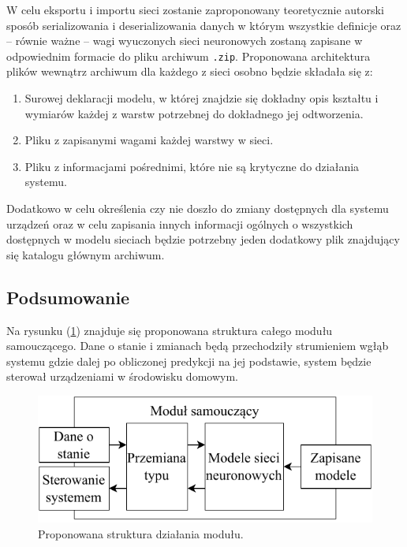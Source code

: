 W celu eksportu i importu sieci zostanie zaproponowany teoretycznie autorski sposób serializowania i deserializowania danych w którym wszystkie definicje oraz -- równie ważne -- wagi wyuczonych sieci neuronowych zostaną zapisane w odpowiednim formacie do pliku archiwum \verb+.zip+. Proponowana architektura plików wewnątrz archiwum dla każdego z sieci osobno będzie składała się z:
\begin{enumerate}
    \item Surowej deklaracji modelu, w której znajdzie się dokładny opis kształtu i wymiarów każdej z warstw potrzebnej do dokładnego jej odtworzenia.
    \item Pliku z zapisanymi wagami każdej warstwy w sieci.
    \item Pliku z informacjami pośrednimi, które nie są krytyczne do działania systemu.
\end{enumerate}

Dodatkowo w celu określenia czy nie doszło do zmiany dostępnych dla systemu urządzeń oraz w celu zapisania innych informacji ogólnych o wszystkich dostępnych w modelu sieciach będzie potrzebny jeden dodatkowy plik znajdujący się katalogu głównym archiwum.

\subsection{Podsumowanie}
Na rysunku (\ref{fig:architektura_modułu}) znajduje się proponowana struktura całego modułu samouczącego. Dane o stanie i zmianach będą przechodziły strumieniem wgłąb systemu gdzie dalej po obliczonej predykcji na jej podstawie, system będzie sterował urządzeniami w środowisku domowym.

\begin{figure}
    \centering\includegraphics[width=.55\textwidth]{img/architecture_module.pdf}
    \caption{Proponowana struktura działania modułu.} \label{fig:architektura_modułu}
\end{figure}



